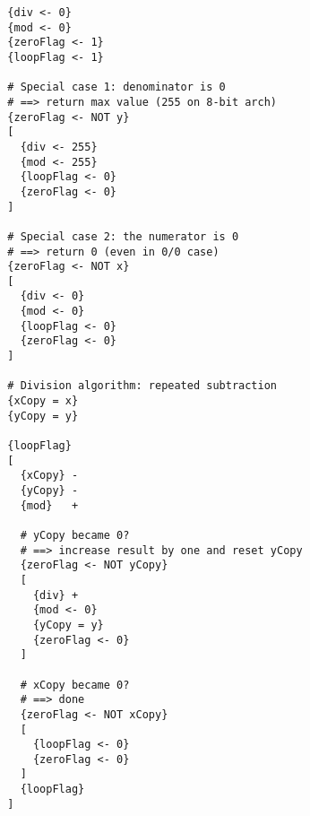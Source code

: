 \begin{lstlisting}
  {div <- 0}
  {mod <- 0}
  {zeroFlag <- 1}  
  {loopFlag <- 1}

  # Special case 1: denominator is 0
  # ==> return max value (255 on 8-bit arch)
  {zeroFlag <- NOT y}
  [
    {div <- 255}
    {mod <- 255}
    {loopFlag <- 0}
    {zeroFlag <- 0}
  ]

  # Special case 2: the numerator is 0
  # ==> return 0 (even in 0/0 case)
  {zeroFlag <- NOT x}
  [
    {div <- 0}
    {mod <- 0}
    {loopFlag <- 0}
    {zeroFlag <- 0}
  ]

  # Division algorithm: repeated subtraction
  {xCopy = x}
  {yCopy = y}

  {loopFlag}
  [
    {xCopy} -
    {yCopy} -
    {mod}   +

    # yCopy became 0?
    # ==> increase result by one and reset yCopy
    {zeroFlag <- NOT yCopy}
    [
      {div} +
      {mod <- 0}
      {yCopy = y}
      {zeroFlag <- 0}
    ]

    # xCopy became 0?
    # ==> done
    {zeroFlag <- NOT xCopy}
    [
      {loopFlag <- 0}
      {zeroFlag <- 0}
    ]
    {loopFlag}
  ]    
\end{lstlisting}

    
